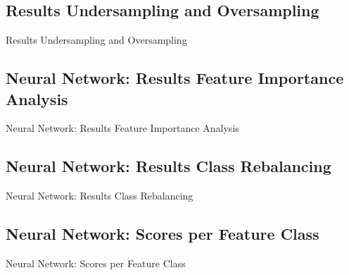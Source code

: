 \subsection{Results Undersampling and Oversampling}
\label{ssec:ruo}
\begin{table}[H]
\begin{footnotesize}

\end{footnotesize}
\caption{\label{tab:ruo} Results Undersampling and Oversampling}
\end{table}

\subsection{Neural Network: Results Feature Importance Analysis}
\label{ssec:nnfi}
\begin{table}[H]
\begin{footnotesize}

\end{footnotesize}
\caption{\label{tab:nnfi} Neural Network: Results Feature Importance Analysis}
\end{table}

\subsection{Neural Network: Results Class Rebalancing}
\label{ssec:nnci}
\begin{table}[H]
\begin{footnotesize}

\end{footnotesize}
\caption{\label{tab:nnci} Neural Network: Results Class Rebalancing}
\end{table}

\subsection{Neural Network: Scores per Feature Class}
\label{ssec:nnfeat}
\begin{table}[H]
\begin{footnotesize}

\end{footnotesize}
\caption{\label{tab:nnfeat} Neural Network: Scores per Feature Class}
\end{table}